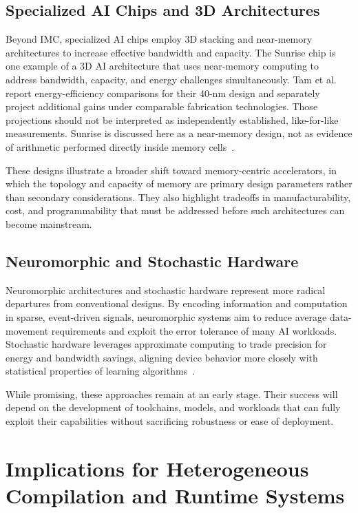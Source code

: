 \documentclass[conference]{IEEEtran}
\begin{document}
\subsection{Specialized AI Chips and 3D Architectures}

Beyond IMC, specialized AI chips employ 3D stacking and near-memory architectures to increase effective bandwidth and capacity. The Sunrise chip is one example of a 3D AI architecture that uses near-memory computing to address bandwidth, capacity, and energy challenges simultaneously. Tam et al. report energy-efficiency comparisons for their 40-nm design and separately project additional gains under comparable fabrication technologies. Those projections should not be interpreted as independently established, like-for-like measurements. Sunrise is discussed here as a near-memory design, not as evidence of arithmetic performed directly inside memory cells~\cite{sunrise2020}.

These designs illustrate a broader shift toward memory-centric accelerators, in which the topology and capacity of memory are primary design parameters rather than secondary considerations. They also highlight tradeoffs in manufacturability, cost, and programmability that must be addressed before such architectures can become mainstream.

\subsection{Neuromorphic and Stochastic Hardware}

Neuromorphic architectures and stochastic hardware represent more radical departures from conventional designs. By encoding information and computation in sparse, event-driven signals, neuromorphic systems aim to reduce average data-movement requirements and exploit the error tolerance of many AI workloads. Stochastic hardware leverages approximate computing to trade precision for energy and bandwidth savings, aligning device behavior more closely with statistical properties of learning algorithms~\cite{roy2025breaking}.

While promising, these approaches remain at an early stage. Their success will depend on the development of toolchains, models, and workloads that can fully exploit their capabilities without sacrificing robustness or ease of deployment.

\section{Implications for Heterogeneous Compilation and Runtime Systems}
\label{sec:compilers}
\end{document}
